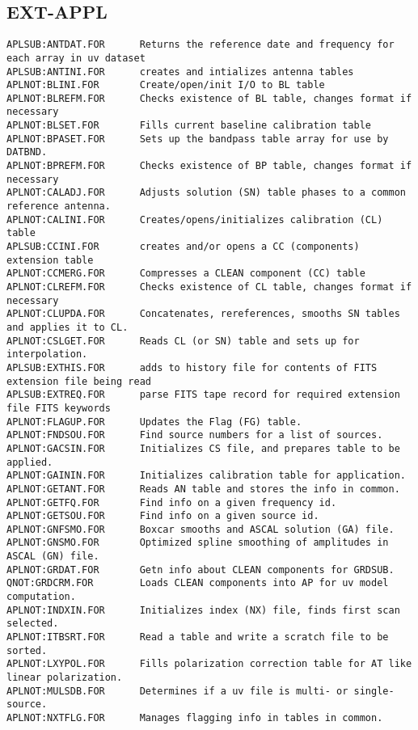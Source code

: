\subsection{EXT-APPL}
\begin{verbatim}
APLSUB:ANTDAT.FOR      Returns the reference date and frequency for each array in uv dataset
APLSUB:ANTINI.FOR      creates and intializes antenna tables
APLNOT:BLINI.FOR       Create/open/init I/O to BL table
APLNOT:BLREFM.FOR      Checks existence of BL table, changes format if necessary
APLNOT:BLSET.FOR       Fills current baseline calibration table
APLNOT:BPASET.FOR      Sets up the bandpass table array for use by DATBND.
APLNOT:BPREFM.FOR      Checks existence of BP table, changes format if necessary
APLNOT:CALADJ.FOR      Adjusts solution (SN) table phases to a common reference antenna.
APLNOT:CALINI.FOR      Creates/opens/initializes calibration (CL) table
APLSUB:CCINI.FOR       creates and/or opens a CC (components) extension table
APLNOT:CCMERG.FOR      Compresses a CLEAN component (CC) table
APLNOT:CLREFM.FOR      Checks existence of CL table, changes format if necessary
APLNOT:CLUPDA.FOR      Concatenates, rereferences, smooths SN tables and applies it to CL.
APLNOT:CSLGET.FOR      Reads CL (or SN) table and sets up for interpolation.
APLSUB:EXTHIS.FOR      adds to history file for contents of FITS extension file being read
APLSUB:EXTREQ.FOR      parse FITS tape record for required extension file FITS keywords
APLNOT:FLAGUP.FOR      Updates the Flag (FG) table.
APLNOT:FNDSOU.FOR      Find source numbers for a list of sources.
APLNOT:GACSIN.FOR      Initializes CS file, and prepares table to be applied.
APLNOT:GAININ.FOR      Initializes calibration table for application.
APLNOT:GETANT.FOR      Reads AN table and stores the info in common.
APLNOT:GETFQ.FOR       Find info on a given frequency id.
APLNOT:GETSOU.FOR      Find info on a given source id.
APLNOT:GNFSMO.FOR      Boxcar smooths and ASCAL solution (GA) file.
APLNOT:GNSMO.FOR       Optimized spline smoothing of amplitudes in ASCAL (GN) file.
APLNOT:GRDAT.FOR       Getn info about CLEAN components for GRDSUB.
QNOT:GRDCRM.FOR        Loads CLEAN components into AP for uv model computation.
APLNOT:INDXIN.FOR      Initializes index (NX) file, finds first scan selected.
APLNOT:ITBSRT.FOR      Read a table and write a scratch file to be sorted.
APLNOT:LXYPOL.FOR      Fills polarization correction table for AT like linear polarization.
APLNOT:MULSDB.FOR      Determines if a uv file is multi- or single- source.
APLNOT:NXTFLG.FOR      Manages flagging info in tables in common.

\end{verbatim}
